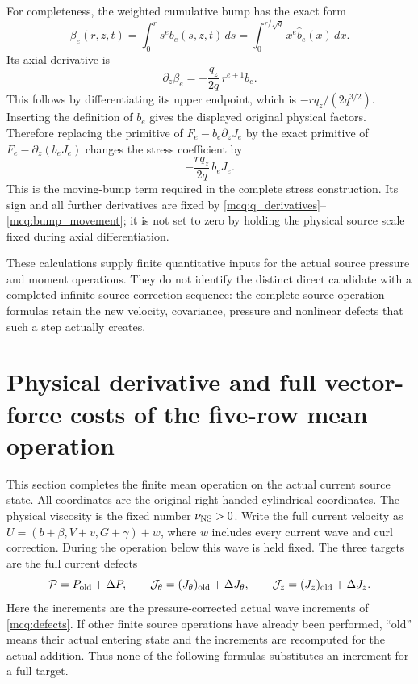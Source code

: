 For completeness, the weighted cumulative bump has the exact form
\[
 \beta_e(r,z,t)=\int_0^rs^eb_e(s,z,t)\,ds
              =\int_0^{r/\sqrt q}x^e\widehat b_e(x)\,dx .
\]
Its axial derivative is
\begin{equation}\label{mcq:bump_movement}
 \partial_z\beta_e
 =-\frac{q_z}{2q}\,r^{e+1}b_e .
\end{equation}
This follows by differentiating its upper endpoint, which is
\(-rq_z/(2q^{3/2})\). Inserting the definition of \(b_e\) gives
the displayed original physical factors. Therefore replacing the
primitive of \(F_e-b_e\partial_zJ_e\) by the exact primitive of
\(F_e-\partial_z(b_eJ_e)\) changes the stress coefficient by
\[
 -\frac{rq_z}{2q}\,b_eJ_e .
\]
This is the moving-bump term required in the complete stress construction.
Its sign and all further derivatives are fixed by
\eqref{mcq:q_derivatives}--\eqref{mcq:bump_movement}; it is not set to zero
by holding the physical source scale fixed during axial differentiation.

These calculations supply finite quantitative inputs for the actual
source pressure and moment operations. They do not identify the
distinct direct candidate with a completed infinite source correction
sequence: the complete source-operation formulas retain the new
velocity, covariance, pressure and nonlinear defects that such a step
actually creates.


\section{Physical derivative and full vector-force costs of the five-row mean operation}
\label{mcmean:section}

This section completes the finite mean operation on the actual current
source state. All coordinates are the original right-handed cylindrical
coordinates. The physical viscosity is the fixed number
\(\nu_{\rm NS}>0\). Write the full current velocity as
\(U=(b+\beta,V+v,G+\gamma)+w\), where \(w\) includes every current
wave and curl correction. During the operation below this wave is held
fixed. The three targets are the full current defects
\begin{equation}\label{mcmean:full_targets}
 \mathcal P=P_{\rm old}+\Delta P,\qquad
 \mathcal J_\theta=(J_\theta)_{\rm old}+\Delta J_\theta,\qquad
 \mathcal J_z=(J_z)_{\rm old}+\Delta J_z.
\end{equation}
Here the increments are the pressure-corrected actual wave increments
of \eqref{mcq:defects}. If other finite source operations have already
been performed, ``old'' means their actual entering state and the
increments are recomputed for the actual addition. Thus none of the
following formulas substitutes an increment for a full target.

